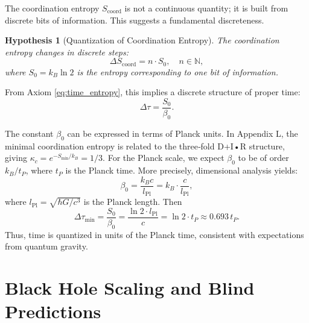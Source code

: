 \documentclass[12pt,a4paper]{article}
\newtheorem{hypothesis}[theorem]{Hypothesis}
\newcommand{\kappac}{\kappa_c}
\newcommand{\Lpl}{l_{\mathrm{Pl}}}
\newcommand{\Scoord}{S_{\mathrm{coord}}}
\begin{document}
	The coordination entropy \(\Scoord\) is not a continuous quantity; it is built from discrete bits of information. This suggests a fundamental discreteness.
	
	\begin{hypothesis}[Quantization of Coordination Entropy]
		The coordination entropy changes in discrete steps:
		\begin{equation}
			\Delta \Scoord = n \cdot S_0, \quad n \in \mathbb{N},
		\end{equation}
		where \(S_0 = k_B \ln 2\) is the entropy corresponding to one bit of information.
	\end{hypothesis}
	
	From Axiom \ref{eq:time_entropy}, this implies a discrete structure of proper time:
	\begin{equation}
		\Delta \tau = \frac{S_0}{\beta_0}.
	\end{equation}
	
	The constant \(\beta_0\) can be expressed in terms of Planck units. In Appendix L, the minimal coordination entropy is related to the three‑fold D+I•R structure, giving \(\kappac = e^{-S_{\min}/k_B} = 1/3\). For the Planck scale, we expect \(\beta_0\) to be of order \(k_B / t_P\), where \(t_P\) is the Planck time. More precisely, dimensional analysis yields:
	\begin{equation}
		\beta_0 = \frac{k_B c}{\Lpl} = k_B \cdot \frac{c}{\Lpl},
	\end{equation}
	where \(\Lpl = \sqrt{\hbar G/c^3}\) is the Planck length. Then
	\begin{equation}
		\Delta \tau_{\min} = \frac{S_0}{\beta_0} = \frac{\ln 2 \cdot \Lpl}{c} = \ln 2 \cdot t_P \approx 0.693 \, t_P.
	\end{equation}
	Thus, time is quantized in units of the Planck time, consistent with expectations from quantum gravity.
	
	\section{Black Hole Scaling and Blind Predictions}
	\label{sec:blackhole}
	
\end{document}
